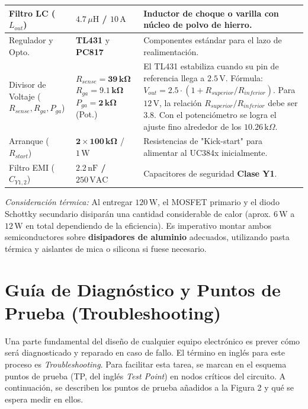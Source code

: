 \documentclass[12pt, a4paper]{article}
\begin{document}
\begin{table}[H]
\begin{tabular}{|p{3.5cm}|p{4.0cm}|p{7.5cm}|}
        Filtro LC ($L_{out}$) & \textbf{$4.7\,\mu\text{H}$ / $10\,\text{A}$} & Inductor de choque o varilla con núcleo de polvo de hierro. \\ \hline
        Regulador y Opto. & \textbf{TL431} y \textbf{PC817} & Componentes estándar para el lazo de realimentación. \\ \hline
        Divisor de Voltaje \newline ($R_{sense}, R_{ga}, P_{ga}$) & $R_{sense} = \mathbf{39\,\text{k}\Omega}$ \newline $R_{ga} = \mathbf{9.1\,\text{k}\Omega}$ \newline $P_{ga} = \mathbf{2\,\text{k}\Omega}$ (Pot.) & El TL431 estabiliza cuando su pin de referencia llega a $2.5\,\text{V}$. \newline Fórmula: $V_{out} = 2.5 \cdot (1 + R_{superior} / R_{inferior})$. \newline Para $12\,\text{V}$, la relación $R_{superior} / R_{inferior}$ debe ser $3.8$. Con el potenciómetro se logra el ajuste fino alrededor de los $10.26\,\text{k}\Omega$. \\ \hline
        Arranque ($R_{start}$) & $\mathbf{2 \times 100\,\text{k}\Omega}$ / $1\,\text{W}$ & Resistencias de "Kick-start" para alimentar al UC384x inicialmente. \\ \hline
        Filtro EMI ($C_{Y1,2}$) & \textbf{$2.2\,\text{nF}$ / $250\,\text{VAC}$} & Capacitores de seguridad \textbf{Clase Y1}. \\ \hline
    \end{tabular}
\end{table}

\textit{Consideración térmica:} Al entregar $120\,\text{W}$, el MOSFET primario y el diodo Schottky secundario disiparán una cantidad considerable de calor (aprox. $6\,\text{W}$ a $12\,\text{W}$ en total dependiendo de la eficiencia). Es imperativo montar ambos semiconductores sobre \textbf{disipadores de aluminio} adecuados, utilizando pasta térmica y aislantes de mica o silicona si fuese necesario.

\newpage
\section{Guía de Diagnóstico y Puntos de Prueba (Troubleshooting)}

Una parte fundamental del diseño de cualquier equipo electrónico es prever cómo será diagnosticado y reparado en caso de fallo. El término en inglés para este proceso es \textit{Troubleshooting}. Para facilitar esta tarea, se marcan en el esquema puntos de prueba (TP, del inglés \textit{Test Point}) en nodos críticos del circuito. A continuación, se describen los puntos de prueba añadidos a la Figura 2 y qué se espera medir en ellos.
\end{document}
